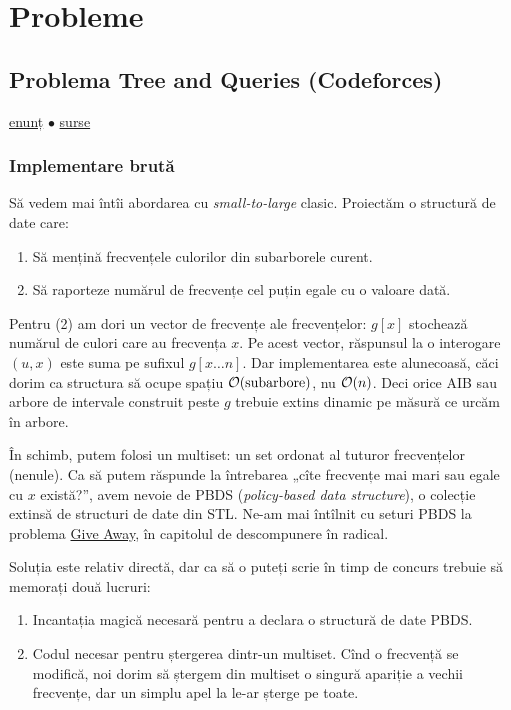 \documentclass[../main.tex]{subfiles}
\begin{document}
\section{Probleme}

\subsection{Problema Tree and Queries (Codeforces)}
\label{problem:tree-and-queries}

\href{https://codeforces.com/contest/375/problem/D}{enunț}
$\bullet$
\hyperref[code:tree-and-queries]{surse}

\subsubsection*{Implementare brută}

Să vedem mai întîi abordarea cu \textit{small-to-large} clasic. Proiectăm o structură de date care:

\begin{enumerate}
  \item Să mențină frecvențele culorilor din subarborele curent.
  \item Să raporteze numărul de frecvențe cel puțin egale cu o valoare dată.
\end{enumerate}

Pentru (2) am dori un vector de frecvențe ale frecvențelor: $g[x]$ stochează numărul de culori care au frecvența $x$. Pe acest vector, răspunsul la o interogare $(u, x)$ este suma pe sufixul $g[x \dots n]$. Dar implementarea este alunecoasă, căci dorim ca structura să ocupe spațiu $\mathcal{O}(\text{subarbore})$, nu $\mathcal{O}(n)$. Deci orice AIB sau arbore de intervale construit peste $g$ trebuie extins dinamic pe măsură ce urcăm în arbore.

În schimb, putem folosi un multiset: un set ordonat al tuturor frecvențelor (nenule). Ca să putem răspunde la întrebarea „cîte frecvențe mai mari sau egale cu $x$ există?”, avem nevoie de PBDS (\textit{policy-based data structure}), o colecție extinsă de structuri de date din STL. Ne-am mai întîlnit cu seturi PBDS la problema \hyperref[problem:give-away]{Give Away}, în capitolul de descompunere în radical.

Soluția este relativ directă, dar ca să o puteți scrie în timp de concurs trebuie să memorați două lucruri:

\begin{enumerate}
  \item Incantația magică necesară pentru a declara o structură de date PBDS.

  \item Codul necesar pentru ștergerea dintr-un multiset. Cînd o frecvență se modifică, noi dorim să ștergem din multiset o singură apariție a vechii frecvențe, dar un simplu apel la  le-ar șterge pe toate.
\end{enumerate}
\end{document}
